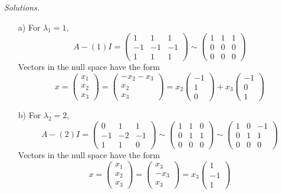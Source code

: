     \ifnum {} {\color{DarkBlue} \textit{Solutions.} 
    \begin{enumerate}
        \item[a)] For $\lambda_1 = 1$, 
        $$A - (1) I = \begin{pmatrix} 1&1&1\\-1&-1&-1\\1&1&1\end{pmatrix}\sim\begin{pmatrix} 1&1&1\\0&0&0\\0&0&0\end{pmatrix}$$ Vectors in the null space have the form $$x = \begin{pmatrix}x_1\\x_2\\x_3 \end{pmatrix} = \begin{pmatrix}-x_2-x_3\\x_2\\x_3 \end{pmatrix} = x_2\begin{pmatrix} -1\\1\\0\end{pmatrix} + x_3 \begin{pmatrix} -1\\0\\1\end{pmatrix}$$ 
        \item[b)] For $\lambda_2 = 2$, 
        $$A - (2) I = \begin{pmatrix} 0&1&1\\-1&-2&-1\\1&1&0\end{pmatrix}\sim\begin{pmatrix} 1&1&0\\0&1&1\\0&0&0\end{pmatrix}\sim\begin{pmatrix} 1&0&-1\\0&1&1\\0&0&0\end{pmatrix}$$ Vectors in the null space have the form $$x = \begin{pmatrix}x_1\\x_2\\x_3 \end{pmatrix} = \begin{pmatrix}x_3\\-x_3\\x_3 \end{pmatrix} = x_3 \begin{pmatrix} 1\\-1\\1\end{pmatrix}$$ 

\end{enumerate}}
